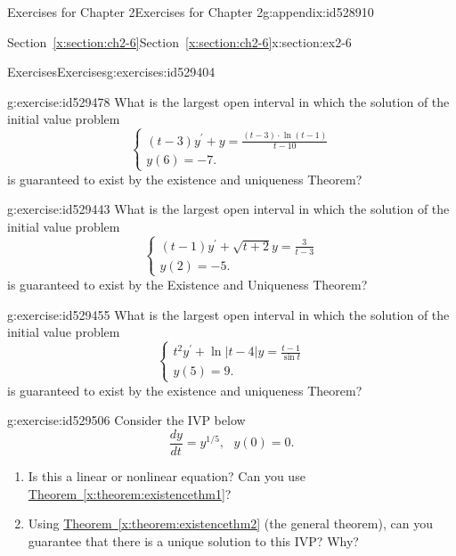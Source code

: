 \documentclass[oneside,10pt,]{book}
\newcommand{\xreffont}{\relax}
\numberwithin{equation}{section}
\numberwithin{equation}{section}
\begin{document}
\begin{appendixptx}{Exercises for Chapter 2}{}{Exercises for Chapter 2}{}{}{g:appendix:id528910}
\begin{sectionptx}{Section~{\xreffont\ref*{x:section:ch2-6}}}{}{Section~{\xreffont\ref*{x:section:ch2-6}}}{}{}{x:section:ex2-6}
\begin{exercises-subsection-numberless}{Exercises}{}{Exercises}{}{}{g:exercises:id529404}
\begin{divisionexercise}{2}{}{}{g:exercise:id529478}
What is the largest open interval in which the solution of the initial value problem%
\begin{equation*}
\begin{cases}
\left(t-3\right)y^{\prime}+y=\frac{\left(t-3\right)\cdot\ln\left(t-1\right)}{t-10}\\
y(6)=-7.
\end{cases}
\end{equation*}
is guaranteed to exist by the existence and uniqueness Theorem?%
\end{divisionexercise}%
\begin{divisionexercise}{3}{}{}{g:exercise:id529443}%
What is the largest open interval in which the solution of the initial value problem%
\begin{equation*}
\begin{cases}
\left(t-1\right)y^{\prime}+\sqrt{t+2}y=\frac{3}{t-3}\\
y(2)=-5.
\end{cases}
\end{equation*}
is guaranteed to exist by the Existence and Uniqueness Theorem?%
\end{divisionexercise}%
\begin{divisionexercise}{4}{}{}{g:exercise:id529455}%
What is the largest open interval in which the solution of the initial value problem%
\begin{equation*}
\begin{cases}
t^{2}y^{\prime}+\ln\left|t-4\right|y=\frac{t-1}{\sin t}\\
y(5)=9.
\end{cases}
\end{equation*}
is guaranteed to exist by the existence and uniqueness Theorem?%
\end{divisionexercise}%
\begin{divisionexercise}{5}{}{}{g:exercise:id529506}%
Consider the IVP below%
\begin{equation*}
\frac{dy}{dt}=y^{1/5},\,\,\,\,y(0)=0.
\end{equation*}
%
%
\begin{enumerate}[label=(\alph*)]
\item{}Is this a linear or nonlinear equation? Can you use \hyperref[x:theorem:existencethm1]{Theorem~{\xreffont\ref{x:theorem:existencethm1}}}?%
\item{}Using \hyperref[x:theorem:existencethm2]{Theorem~{\xreffont\ref{x:theorem:existencethm2}}} (the general theorem), can you guarantee that there is a unique solution to this IVP? Why?%

\end{enumerate}
\end{divisionexercise}
\end{exercises-subsection-numberless}
\end{sectionptx}
\end{appendixptx}
\end{document}

